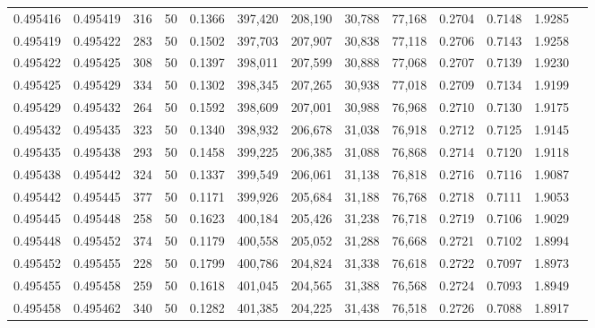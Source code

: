 \begin{tabular}{rrrrrrrrrrrrr}
0.495416 & 0.495419 &   316 &  50 &                                     0.1366 & 397,420 & 208,190 &  30,788 &  77,168 & 0.2704 & 0.7148 & 1.9285 \\
0.495419 & 0.495422 &   283 &  50 &                                     0.1502 & 397,703 & 207,907 &  30,838 &  77,118 & 0.2706 & 0.7143 & 1.9258 \\
0.495422 & 0.495425 &   308 &  50 &                                     0.1397 & 398,011 & 207,599 &  30,888 &  77,068 & 0.2707 & 0.7139 & 1.9230 \\
0.495425 & 0.495429 &   334 &  50 &                                     0.1302 & 398,345 & 207,265 &  30,938 &  77,018 & 0.2709 & 0.7134 & 1.9199 \\
0.495429 & 0.495432 &   264 &  50 &                                     0.1592 & 398,609 & 207,001 &  30,988 &  76,968 & 0.2710 & 0.7130 & 1.9175 \\
0.495432 & 0.495435 &   323 &  50 &                                     0.1340 & 398,932 & 206,678 &  31,038 &  76,918 & 0.2712 & 0.7125 & 1.9145 \\
0.495435 & 0.495438 &   293 &  50 &                                     0.1458 & 399,225 & 206,385 &  31,088 &  76,868 & 0.2714 & 0.7120 & 1.9118 \\
0.495438 & 0.495442 &   324 &  50 &                                     0.1337 & 399,549 & 206,061 &  31,138 &  76,818 & 0.2716 & 0.7116 & 1.9087 \\
0.495442 & 0.495445 &   377 &  50 &                                     0.1171 & 399,926 & 205,684 &  31,188 &  76,768 & 0.2718 & 0.7111 & 1.9053 \\
0.495445 & 0.495448 &   258 &  50 &                                     0.1623 & 400,184 & 205,426 &  31,238 &  76,718 & 0.2719 & 0.7106 & 1.9029 \\
0.495448 & 0.495452 &   374 &  50 &                                     0.1179 & 400,558 & 205,052 &  31,288 &  76,668 & 0.2721 & 0.7102 & 1.8994 \\
0.495452 & 0.495455 &   228 &  50 &                                     0.1799 & 400,786 & 204,824 &  31,338 &  76,618 & 0.2722 & 0.7097 & 1.8973 \\
0.495455 & 0.495458 &   259 &  50 &                                     0.1618 & 401,045 & 204,565 &  31,388 &  76,568 & 0.2724 & 0.7093 & 1.8949 \\
0.495458 & 0.495462 &   340 &  50 &                                     0.1282 & 401,385 & 204,225 &  31,438 &  76,518 & 0.2726 & 0.7088 & 1.8917 \\

\end{tabular}
